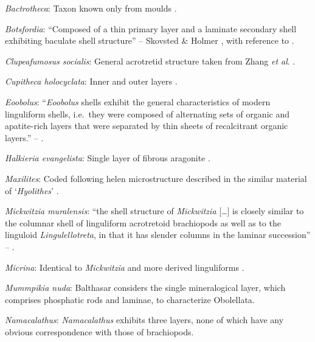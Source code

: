 \documentclass[openany]{book}
\begin{document}
\hypertarget{Bactrotheca-coding-131}{}
\emph{Bactrotheca}: Taxon known only from moulds \citep{Valent2012}.

\hypertarget{Botsfordia-coding-131}{}
\emph{Botsfordia}: ``Composed of a thin primary layer and a laminate
secondary shell exhibiting baculate shell structure'' -- Skovsted \&
Holmer \citeyearpar{Skovsted2005EarlyCambrian}, with reference to
\citet{Skovsted2003EarlyCambrian}.

\hypertarget{Clupeafumosus_socialis-coding-131}{}
\emph{Clupeafumosus socialis}: General acrotretid structure taken from
Zhang \emph{et al}. \citeyearpar{Zhang2016Epithelialcell}.

\hypertarget{Cupitheca_holocyclata-coding-131}{}
\emph{Cupitheca holocyclata}: Inner and outer layers
\citep{Vendrasco2017}.

\hypertarget{Eoobolus-coding-131}{}
\emph{Eoobolus}: ``\emph{Eoobolus} shells exhibit the general
characteristics of modern linguliform shells, i.e.~they were composed of
alternating sets of organic and apatite-rich layers that were separated
by thin sheets of recalcitrant organic layers.'' --
\citet{Balthasar2007Anearly}.

\hypertarget{Halkieria_evangelista-coding-131}{}
\emph{Halkieria evangelista}: Single layer of fibrous aragonite
\citep{Porter2008}.

\hypertarget{Maxilites-coding-131}{}
\emph{Maxilites}: Coded following helen microstructure described in the
similar material of `\emph{Hyolithes}' \citep{MartiMus2007}.

\hypertarget{Mickwitzia_muralensis-coding-131}{}
\emph{Mickwitzia muralensis}: ``the shell structure of \emph{Mickwitzia}
{[}\ldots{}{]} is closely similar to the columnar shell of linguliform
acrotretoid brachiopods as well as to the linguloid
\emph{Lingulellotreta}, in that it has slender columns in the laminar
succession'' -- \citet{Williams2007Supplement}.

\hypertarget{Micrina-coding-131}{}
\emph{Micrina}: Identical to \emph{Mickwitzia} and more derived
linguliforms \citep{Holmer2011Firstrecord}.

\hypertarget{Mummpikia_nuda-coding-131}{}
\emph{Mummpikia nuda}: Balthasar \citeyearpar{Balthasar2008iMummpikia}
considers the single mineralogical layer, which comprises phosphatic
rods and laminae, to characterize Obolellata.

\hypertarget{Namacalathus-coding-131}{}
\emph{Namacalathus}: \emph{Namacalathus} exhibits three layers, none of
which have any obvious correspondence with those of brachiopods.
\end{document}
